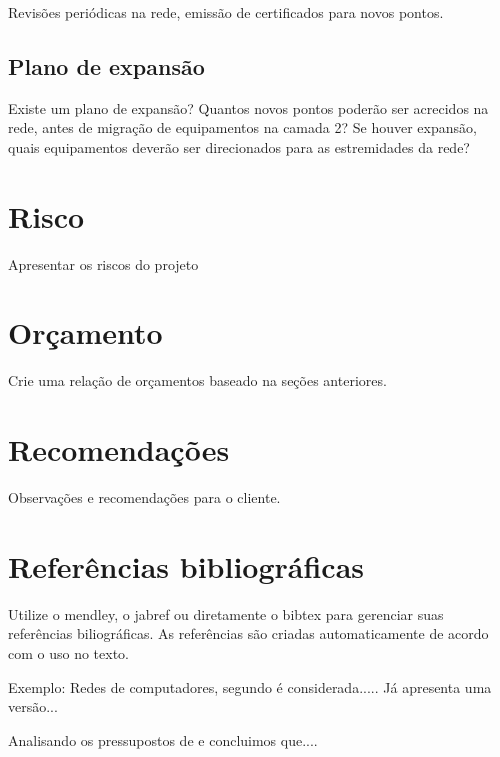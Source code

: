 \documentclass[	DIV=calc,%
							paper=a4,%
							fontsize=12pt,%
							onecolumn]{scrartcl}	 					%
\begin{document}
Revisões periódicas na rede, emissão de certificados para novos pontos.

\subsection{Plano de expansão}
Existe um plano de expansão? Quantos novos pontos poderão ser acrecidos na rede, antes de migração de equipamentos na camada 2? Se houver expansão, quais equipamentos deverão ser direcionados para as estremidades da rede? 

\section{Risco}
Apresentar os riscos do projeto

\section{Orçamento}
Crie uma relação de orçamentos baseado na seções anteriores.

\section{Recomendações}
Observações e recomendações para o cliente.

\section{Referências bibliográficas}
Utilize o mendley, o jabref ou diretamente o bibtex para gerenciar suas referências biliográficas. As referências são criadas automaticamente de acordo com o uso no texto.

Exemplo: Redes de computadores, segundo \cite{t2013} é considerada..... Já \cite{kurose2010} apresenta uma versão...

Analisando os pressupostos de \cite{ref3} e \cite{ref4} concluimos que....


\renewcommand\refname{} %

  
\end{document}
